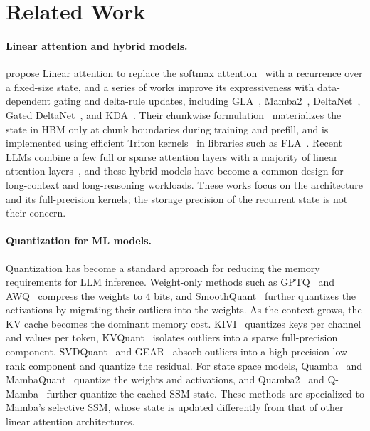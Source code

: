 \section{Related Work}

\paragraph{Linear attention and hybrid models.}
\cite{katharopoulos2020transformers} propose Linear attention to replace the softmax attention~\citep{vaswani2017attention} with a recurrence over a fixed-size state, and a series of works improve its expressiveness with data-dependent gating and delta-rule updates, including GLA~\citep{yang2023gated}, Mamba2~\citep{dao2024transformers}, DeltaNet~\citep{schlag2021linear,yang2024parallelizing}, Gated DeltaNet~\citep{yang2025gated}, and KDA~\citep{team2025kimi}.
Their chunkwise formulation~\citep{yang2023gated} materializes the state in HBM only at chunk boundaries during training and prefill, and is implemented using efficient Triton kernels~\citep{triton} in libraries such as FLA~\citep{yang2024fla}.
Recent LLMs combine a few full or sparse attention layers with a majority of linear attention layers~\citep{qwen2025qwen3next,team2026kimi,zai2026glm53flash,blakeman2025nemotron}, and these hybrid models have become a common design for long-context and long-reasoning workloads.
These works focus on the architecture and its full-precision kernels; the storage precision of the recurrent state is not their concern.

\paragraph{Quantization for ML models.}
Quantization has become a standard approach for reducing the memory requirements for LLM inference.
Weight-only methods such as GPTQ~\citep{frantar2022gptq} and AWQ~\citep{lin2024awq} compress the weights to 4 bits, and SmoothQuant~\citep{xiao2023smoothquant} further quantizes the activations by migrating their outliers into the weights.
As the context grows, the KV cache becomes the dominant memory cost. KIVI~\citep{liu2024kivi} quantizes keys per channel and values per token, KVQuant~\citep{hooper2024kvquant} isolates outliers into a sparse full-precision component.
SVDQuant~\citep{li2024svdquant} and GEAR~\citep{kang2024gear} absorb outliers into a high-precision low-rank component and quantize the residual.
For state space models, Quamba~\citep{chiang2025quamba} and MambaQuant~\citep{yue2025mambaquant} quantize the weights and activations, and Quamba2~\citep{chiang2025quamba2} and Q-Mamba~\citep{tianqi2025q} further quantize the cached SSM state.
These methods are specialized to Mamba's selective SSM, whose state is updated differently from that of other linear attention architectures.

